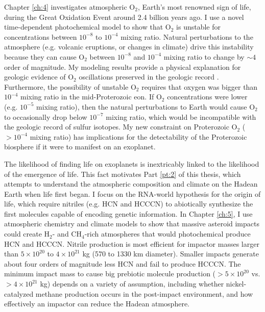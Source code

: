 Chapter \ref{ch:4} investigates atmospheric O$_2$, Earth's most renowned sign of life, during the Great Oxidation Event around 2.4 billion years ago. I use a novel time-dependent photochemical model to show that O$_2$ is unstable for concentrations between $10^{-8}$ to $10^{-4}$ mixing ratio. Natural perturbations to the atmosphere (e.g. volcanic eruptions, or changes in climate) drive this instability because they can cause O$_2$ between $10^{-8}$ and $10^{-4}$ mixing ratio to change by $\sim 4$ order of magnitude. My modeling results provide a physical explanation for geologic evidence of O$_2$ oscillations preserved in the geologic record \citep{Poulton_2021}. Furthermore, the possibility of unstable O$_2$ requires that oxygen was bigger than $10^{-4}$ mixing ratio in the mid-Proterozoic eon. If O$_2$ concentrations were lower (e.g. $10^{-5}$ mixing ratio), then the natural perturbations to Earth would cause O$_2$ to occasionally drop below $10^{-7}$ mixing ratio, which would be incompatible with the geologic record of sulfur isotopes. My new constraint on Proterozoic O$_2$ ($> 10^{-4}$ mixing ratio) has implications for the detectability of the Proterozoic biosphere if it were to manifest on an exoplanet.

The likelihood of finding life on exoplanets is inextricably linked to the likelihood of the emergence of life. This fact motivates Part \ref{pt:2} of this thesis, which attempts to understand the atmospheric composition and climate on the Hadean Earth when life first began. I focus on the RNA-world hypothesis for the origin of life, which require nitriles (e.g. HCN and HCCCN) to abiotically synthesize the first molecules capable of encoding genetic information. In Chapter \ref{ch:5}, I use atmospheric chemistry and climate models to show that massive asteroid impacts could create H$_2$- and CH$_4$-rich atmospheres that would photochemical produce HCN and HCCCN. Nitrile production is most efficient for impactor masses larger than $5 \times 10^{20}$ to $4 \times 10^{21}$ kg (570 to 1330 km diameter). Smaller impacts generate about four orders of magnitude less HCN and fail to produce HCCCN. The minimum impact mass to cause big prebiotic molecule production ($> 5 \times 10^{20}$ vs. $> 4 \times 10^{21}$ kg) depends on a variety of assumption, including whether nickel-catalyzed methane production occurs in the post-impact environment, and how effectively an impactor can reduce the Hadean atmosphere.


